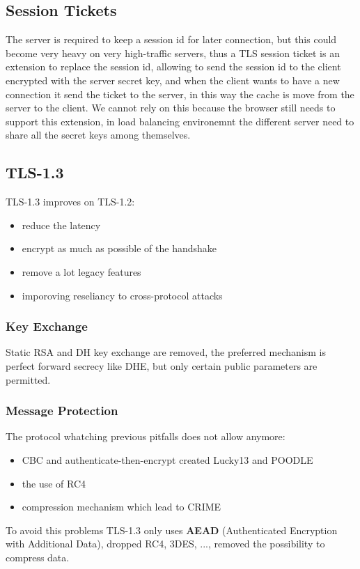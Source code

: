 \documentclass[12pt]{article}
\begin{document}
\subsection{Session Tickets}
The server is required to keep a session id for later connection, but this could become very heavy on very high-traffic servers, thus a TLS session ticket is an extension to replace the session id, allowing to send the session id to the client encrypted with the server secret key, and when the client wants to have a new connection it send the ticket to the server, in this way the cache is move from the server to the client. We cannot rely on this because the browser still needs to support this extension, in load balancing environemnt the different server need to share all the secret keys among themselves.



\subsection{TLS-1.3}
TLS-1.3 improves on TLS-1.2:
\begin{itemize}
  \item reduce the latency
  \item encrypt as much as possible of the handshake
  \item remove a lot legacy features
  \item imporoving reseliancy to cross-protocol attacks
\end{itemize}

\subsubsection{Key Exchange}
Static RSA and DH key exchange are removed, the preferred mechanism is perfect forward secrecy like DHE, but only certain public parameters are permitted. 

\subsubsection{Message Protection}
The protocol whatching previous pitfalls does not allow anymore:
\begin{itemize}
  \item CBC and authenticate-then-encrypt created Lucky13 and POODLE
  \item the use of RC4 
  \item compression mechanism which lead to CRIME
\end{itemize}
To avoid this problems TLS-1.3 only uses \textbf{AEAD} (Authenticated Encryption with Additional Data), dropped RC4, 3DES, ..., removed the possibility to compress data.
\end{document}
